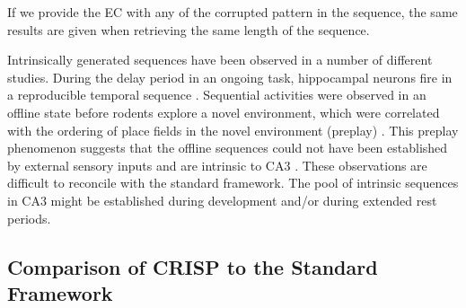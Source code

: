 \documentclass[utf8]{frontiersSCNS} %
\begin{document}
If we provide the EC with any of the corrupted pattern in the sequence, the same results are given when retrieving the same length of the sequence.  



Intrinsically generated sequences have been observed in a number of different studies. During the delay period in an ongoing task, hippocampal neurons fire in a reproducible temporal sequence \cite{pastalkova2008internally, macdonald2011hippocampal}.  Sequential activities were observed in an offline state before rodents explore a novel environment, which were correlated with the ordering of place fields in the novel environment (preplay) \cite{dragoi2011preplay}. This preplay phenomenon suggests that the offline sequences could not have been established by external sensory inputs and are intrinsic to CA3 \cite{azizi2013computational}. These observations are difficult to reconcile with the standard framework. The pool of intrinsic sequences in CA3 might be established during development and/or during extended rest periods.  


\subsection{Comparison of CRISP to the Standard Framework}



\end{document}
